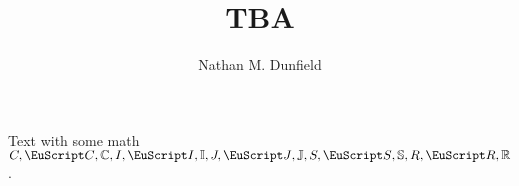 \documentclass[noaddress, tikz]{nmd-article}
\title{TBA}
\author{Nathan M. Dunfield}
\begin{document}
Text with some math
$C, \cC, \C, I, \cI, \mathbb{I}, J, \cJ, \mathbb{J}, S, \cS,
\mathbb{S}, R, \cR, \mathbb{R}$.
\end{document}
